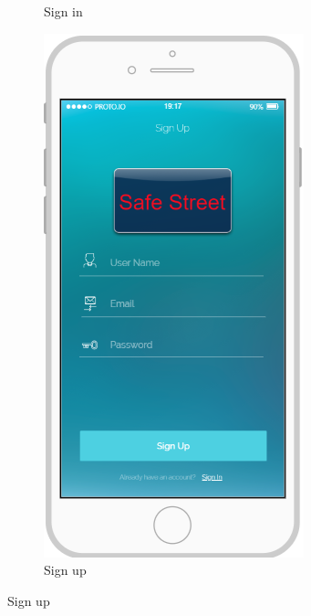 \documentclass{article}
\begin{document}
\begin{figure}[H]
\begin{subfigure}[H]{0.25\linewidth}
					\caption{Sign in}
				\end{subfigure}	
				\begin{subfigure}[H]{0.25\linewidth}
					\includegraphics[width=\linewidth]{Images/Sign_Up.png}
					\caption{Sign up}

\end{subfigure}
\end{figure}
\end{document}
